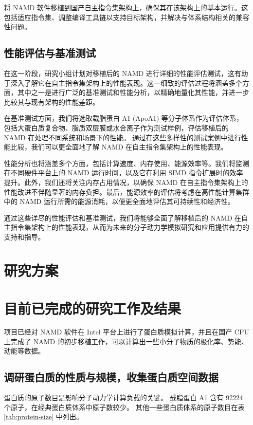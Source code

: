 将 NAMD 软件移植到国产自主指令集架构上，确保其在该架构上的基本运行。这包括适应指令集、调整编译工具链以支持目标架构，并解决与体系结构相关的兼容性问题。

\subsection{性能评估与基准测试}


在这一阶段，研究小组计划对移植后的 NAMD 进行详细的性能评估测试，这有助于深入了解它在自主指令集架构上的性能表现。这一细致的评估过程将涵盖多个方面，其中之一是进行广泛的基准测试和性能分析，以精确地量化其性能，并进一步比较其与现有架构的性能差距。

在基准测试方面，我们将选取载脂蛋白 A1 (ApoA1) 等分子体系作为评估体系，包括大蛋白质复合物、脂质双层膜或水合离子作为测试样例，评估移植后的 NAMD 在处理不同系统和场景下的性能。
通过在这些多样性的测试案例中进行性能比较，我们可以更全面地了解 NAMD 在自主指令集架构上的性能表现。

性能分析也将涵盖多个方面，包括计算速度、内存使用、能源效率等。我们将监测在不同硬件平台上的 NAMD 运行时间，以及它在利用 SIMD 指令扩展时的效率提升。此外，我们还将关注内存占用情况，以确保 NAMD 在自主指令集架构上的性能改进不伴随显著的内存负担。最后，能源效率的评估将考虑在高性能计算集群中的 NAMD 运行所需的能源消耗，以便更全面地评估其可持续性和经济性。

通过这些详尽的性能评估和基准测试，我们将能够全面了解移植后的 NAMD 在自主指令集架构上的性能表现，从而为未来的分子动力学模拟研究和应用提供有力的支持和指导。

\section{研究方案}

\section{目前已完成的研究工作及结果}

项目已经对 NAMD 软件在 Intel 平台上进行了蛋白质模拟计算，并且在国产 CPU 上完成了 NAMD 的初步移植工作，可以计算出一些小分子物质的极化率、势能、动能等数据。

\subsection{调研蛋白质的性质与规模，收集蛋白质空间数据}

蛋白质的原子数目是影响分子动力学计算负载的关键。
载脂蛋白 A1 含有 92224 个原子，在经典蛋白质体系中原子数较少。
其他一些蛋白质体系的原子数目在表 \ref{tab:protein-size} 中列出。

